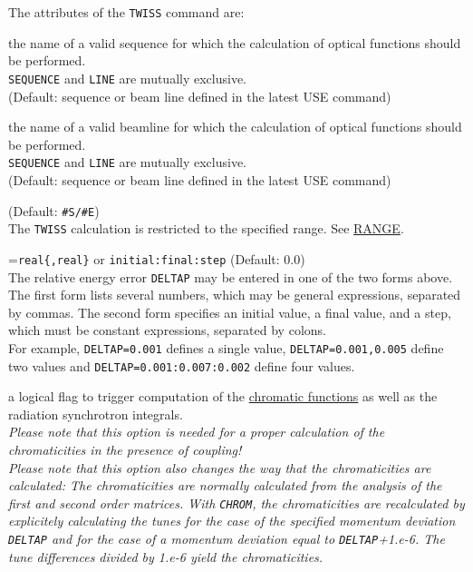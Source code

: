 The  attributes of the {\tt TWISS} command are: 
\begin{madlist}
   the name of a valid sequence for
  which the calculation of optical functions should be performed. \\ 
  {\tt SEQUENCE} and {\tt LINE} are mutually exclusive.\\
  (Default: sequence or beam line defined in the latest USE command)

   the name of a valid beamline for which
  the calculation of optical functions should be performed. \\
  {\tt SEQUENCE} and {\tt LINE} are mutually exclusive.\\
  (Default: sequence or beam line defined in the latest USE command)
  
   (Default: {\tt \#S/\#E})\\
  The {\tt TWISS} calculation is restricted to the specified range.
  See \href{../Introduction/ranges.html#range}{RANGE}.  

  ={\tt real\{,real\}} or {\tt initial:final:step}
  (Default: 0.0)\\ 
  The relative energy error {\tt DELTAP} may be entered in one of the
  two forms above. \\ 
  The first form lists several numbers, which may be general expressions,
  separated by commas. The second form specifies an initial value, a final
  value, and a step, which must be constant expressions, separated by
  colons. \\
  For example, {\tt DELTAP=0.001} defines a single value, 
  {\tt DELTAP=0.001,0.005} define two values and 
  {\tt DELTAP=0.001:0.007:0.002} define four values. 


   a logical flag to trigger computation of the
  \hyperref[subsec:tables_chrom]{chromatic functions} as well as the radiation 
  synchrotron integrals. \\
  \textit{Please note that this option is needed for a proper
    calculation of the chromaticities in the presence of coupling!}\\
  \textit{Please note that this option also changes the way that the
    chromaticities are calculated: The chromaticities are normally
    calculated from the analysis of the first and second order
    matrices. With {\tt CHROM}, the chromaticities are recalculated by
    explicitely calculating the tunes for the case of the specified momentum
    deviation {\tt DELTAP} and for the case of a momentum deviation equal
    to {\tt DELTAP}+1.e-6. The tune differences divided by 1.e-6 yield the
    chromaticities.}


\end{madlist}
